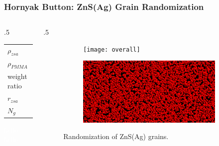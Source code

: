 \documentclass[fleqn]{beamer}
\begin{document}
     
     \begin{frame}
      \frametitle{Hornyak Button: ZnS(Ag) Grain Randomization}
      \begin{columns}[c]
       \begin{column}{.5\textwidth}
        \begin{tabular}{ll}
         $\rho_{zsa}$ & 4.09\\
         $\rho_{PMMA}$ & 1.19\\
         weight ratio & 5\%\\
         $r_{zsa}$ & 20~$\mu$m \cite{fink1982optimization}\\
         $N_g$ & $\boxed{\approx 5\times10^5}$
        \end{tabular}
        \textcolor{white}{hello}\\
        \textcolor{white}{hello}
        
       \end{column}

       \begin{column}{.5\textwidth}
      \begin{figure}[h!tb]
\centering
\begin{subfigure}{.8\textwidth}
\centering
\texttt{[image: overall]}
\label{fig:hb1}
\end{subfigure}
\begin{subfigure}{.8\textwidth}
\centering
\includegraphics[width = \textwidth]{xz_zoom_zoom}
\label{fig:hb2}
\end{subfigure}
\caption{Randomization of ZnS(Ag) grains.}
\label{hb_g4}
\end{figure}
       \end{column}
      \end{columns}
     \end{frame}
     
\end{document}
